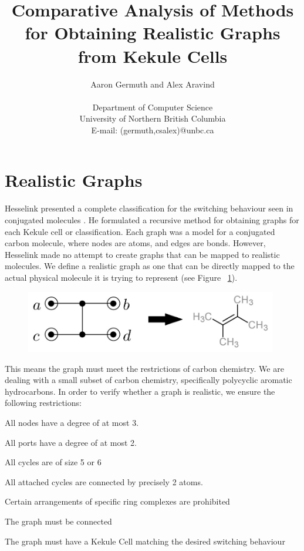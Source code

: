 \documentclass[12pt]{article}
\begin{document}
\title{Comparative Analysis of Methods for Obtaining Realistic Graphs from Kekule Cells}
\author{Aaron Germuth and Alex Aravind \\\\  
Department of Computer Science \\
University of Northern British Columbia \\
E-mail: (germuth,csalex)@unbc.ca}
\maketitle

\section{Realistic Graphs}

Hesselink presented a complete classification for the switching behaviour seen in conjugated molecules \cite{H13}. He formulated a recursive method for obtaining graphs for each Kekule cell or classification. Each graph was a model for a conjugated carbon molecule, where nodes are atoms, and edges are bonds. However, Hesselink made no attempt to create graphs that can be mapped to realistic molecules. We define a realistic graph as one that can be directly mapped to the actual physical molecule it is trying to represent (see Figure ~\ref{fig:graphToMolecule}). 

\begin{figure}[ht!]
\centering
\includegraphics[width=110mm]{graphToMolecule.jpg}
\label{fig:graphToMolecule}
\end{figure}

This means the graph must meet the restrictions of carbon chemistry. We are dealing with a small subset of carbon chemistry, specifically polycyclic aromatic hydrocarbons. In order to verify whether a graph is realistic, we ensure the following restrictions:

\begin{enumerate*}
  \item All nodes have a degree of at most 3.
  \item All ports have a degree of at most 2.
  \item All cycles are of size 5 or 6
  \item All attached cycles are connected by precisely 2 atoms.
  \item Certain arrangements of specific ring complexes are prohibited
  \item The graph must be connected
  \item The graph must have a Kekule Cell matching the desired switching behaviour
\end{enumerate*}
\end{document}
